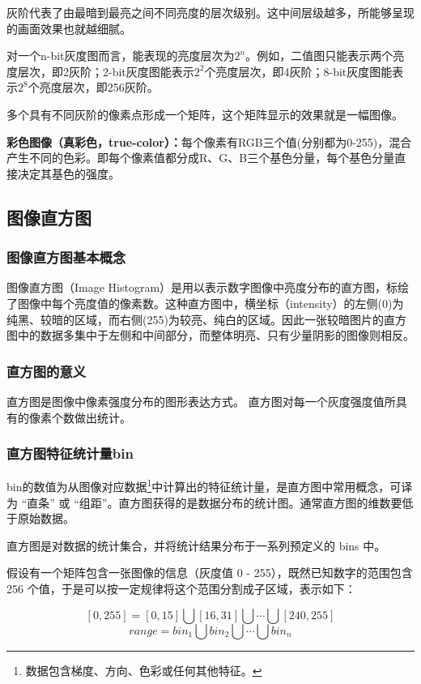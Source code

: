 \documentclass{article}
\begin{document}
灰阶代表了由最暗到最亮之间不同亮度的层次级别。这中间层级越多，所能够呈现的画面效果也就越细腻。

对一个n-bit灰度图而言，能表现的亮度层次为$2^{n}$。例如，二值图只能表示两个亮度层次，即2灰阶；2-bit灰度图能表示$2^{2}$个亮度层次，即4灰阶；8-bit灰度图能表示$2^{8}$个亮度层次，即256灰阶。


多个具有不同灰阶的像素点形成一个矩阵，这个矩阵显示的效果就是一幅图像。

\textbf{彩色图像（真彩色，true-color）：}每个像素有RGB三个值(分别都为0-255)，混合产生不同的色彩。即每个像素值都分成R、G、B三个基色分量，每个基色分量直接决定其基色的强度。





\subsection{图像直方图}

\subsubsection{图像直方图基本概念}
图像直方图（Image Histogram）是用以表示数字图像中亮度分布的直方图，标绘了图像中每个亮度值的像素数。这种直方图中，横坐标（intensity）的左侧(0)为纯黑、较暗的区域，而右侧(255)为较亮、纯白的区域。因此一张较暗图片的直方图中的数据多集中于左侧和中间部分，而整体明亮、只有少量阴影的图像则相反。

\subsubsection{直方图的意义}
直方图是图像中像素强度分布的图形表达方式。
直方图对每一个灰度强度值所具有的像素个数做出统计。

\subsubsection{直方图特征统计量bin}
    bin的数值为从图像对应数据\footnote{数据包含梯度、方向、色彩或任何其他特征。}中计算出的特征统计量，是直方图中常用概念，可译为 “直条” 或 “组距”。直方图获得的是数据分布的统计图。通常直方图的维数要低于原始数据。

直方图是对数据的统计集合，并将统计结果分布于一系列预定义的 bins 中。

假设有一个矩阵包含一张图像的信息（灰度值 0 - 255），既然已知数字的范围包含 256 个值，于是可以按一定规律将这个范围分割成子区域，表示如下：
\begin{center}
$$
[0,255]=[0,15]\bigcup[16,31]\bigcup  \cdots\bigcup  [240,255]
$$
$$
range=bin_{1}\bigcup bin_{2}\bigcup   \cdots \bigcup bin_{n}
$$
\end{center}
\end{document}
